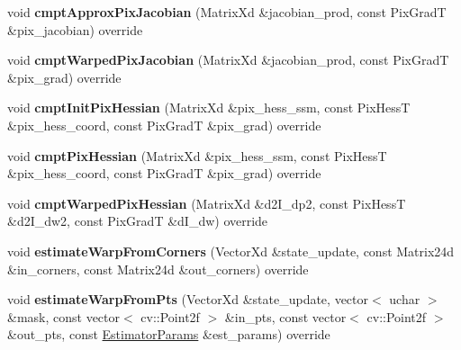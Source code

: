 \begin{DoxyCompactItemize}
\item 
\hypertarget{classSimilitude_abe696d847afe293b3e72d7dd80f45158}{void {\bfseries cmpt\-Approx\-Pix\-Jacobian} (Matrix\-Xd \&jacobian\-\_\-prod, const Pix\-Grad\-T \&pix\-\_\-jacobian) override}\label{classSimilitude_abe696d847afe293b3e72d7dd80f45158}

\item 
\hypertarget{classSimilitude_af94064b2c22646920f70f27ed44c3f4f}{void {\bfseries cmpt\-Warped\-Pix\-Jacobian} (Matrix\-Xd \&jacobian\-\_\-prod, const Pix\-Grad\-T \&pix\-\_\-grad) override}\label{classSimilitude_af94064b2c22646920f70f27ed44c3f4f}

\item 
\hypertarget{classSimilitude_a67a8ed81f464313740a68921405332ed}{void {\bfseries cmpt\-Init\-Pix\-Hessian} (Matrix\-Xd \&pix\-\_\-hess\-\_\-ssm, const Pix\-Hess\-T \&pix\-\_\-hess\-\_\-coord, const Pix\-Grad\-T \&pix\-\_\-grad) override}\label{classSimilitude_a67a8ed81f464313740a68921405332ed}

\item 
\hypertarget{classSimilitude_a54f4d827f79b40bda3c8972c1e21d443}{void {\bfseries cmpt\-Pix\-Hessian} (Matrix\-Xd \&pix\-\_\-hess\-\_\-ssm, const Pix\-Hess\-T \&pix\-\_\-hess\-\_\-coord, const Pix\-Grad\-T \&pix\-\_\-grad) override}\label{classSimilitude_a54f4d827f79b40bda3c8972c1e21d443}

\item 
\hypertarget{classSimilitude_a27ce5e6df51f74fc2d77fbdbcbd998db}{void {\bfseries cmpt\-Warped\-Pix\-Hessian} (Matrix\-Xd \&d2\-I\-\_\-dp2, const Pix\-Hess\-T \&d2\-I\-\_\-dw2, const Pix\-Grad\-T \&d\-I\-\_\-dw) override}\label{classSimilitude_a27ce5e6df51f74fc2d77fbdbcbd998db}

\item 
\hypertarget{classSimilitude_a6b7c56c69ea872c6b85c65ae9c096ce8}{void {\bfseries estimate\-Warp\-From\-Corners} (Vector\-Xd \&state\-\_\-update, const Matrix24d \&in\-\_\-corners, const Matrix24d \&out\-\_\-corners) override}\label{classSimilitude_a6b7c56c69ea872c6b85c65ae9c096ce8}

\item 
\hypertarget{classSimilitude_a838f9a892ec52286b361e9f811135429}{void {\bfseries estimate\-Warp\-From\-Pts} (Vector\-Xd \&state\-\_\-update, vector$<$ uchar $>$ \&mask, const vector$<$ cv\-::\-Point2f $>$ \&in\-\_\-pts, const vector$<$ cv\-::\-Point2f $>$ \&out\-\_\-pts, const \hyperlink{structSSMEstimatorParams}{Estimator\-Params} \&est\-\_\-params) override}\label{classSimilitude_a838f9a892ec52286b361e9f811135429}


\end{DoxyCompactItemize}

